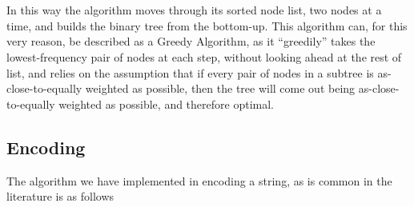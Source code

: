 \documentclass[paper=a4, fontsize=10pt]{article} %
\numberwithin{equation}{section} %
\numberwithin{figure}{section} %
\numberwithin{table}{section} %
\begin{document}
\\
\\
In this way the algorithm moves through its sorted node list, two nodes at a time, and builds the binary tree from the bottom-up. This algorithm can, for this very reason, be described as a Greedy Algorithm, as it ``greedily'' takes the lowest-frequency pair of nodes at each step, without looking ahead at the rest of list, and relies on the assumption that if every pair of nodes in a subtree is as-close-to-equally weighted as possible, then the tree will come out being as-close-to-equally weighted as possible, and therefore optimal.


\subsection{Encoding}
The algorithm we have implemented in encoding a string, as is common in the literature \cite{huffman52}\cite{mackay} is as follows
\end{document}
